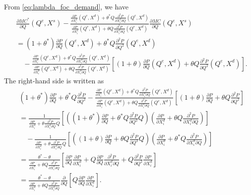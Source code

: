 \documentclass[11pt, a4paper]{article}
\theoremstyle{remark}
\begin{document}
From \eqref{eq:lambda_foc_demand}, we have
\begin{align}
    &\frac{\partial MC^{*}}{\partial Q}(Q^e, X^{s}) - \frac{\frac{\partial P}{\partial X^{d}_i}(Q^e, X^{d}) + \theta^{*} Q\frac{\partial^2 P}{\partial X^{d}_{i}\partial Q}(Q^e, X^{d}) }{\frac{\partial P}{\partial X^{d}_i}(Q^e, X^{d}) + \theta Q\frac{\partial^2 P}{\partial X^{d}_{i}\partial Q}(Q^e, X^{d}) }\frac{\partial MC}{\partial Q}(Q^e, X^{s})\\
    & =  (1+ \theta^{*}) \frac{\partial P}{\partial Q}(Q^e, X^{d}) + \theta^{*} Q\frac{\partial^2 P}{\partial Q^2}(Q^e, X^{d})\\
    &\quad - \frac{\frac{\partial P}{\partial X^{d}_i}(Q^e, X^{d}) + \theta^{*} Q\frac{\partial^2 P}{\partial X^{d}_{i}\partial Q}(Q^e, X^{d}) }{\frac{\partial P}{\partial X^{d}_i}(Q^e, X^{d}) + \theta Q\frac{\partial^2 P}{\partial X^{d}_{i}\partial Q}(Q^e, X^{d}) }\left[(1+ \theta) \frac{\partial P}{\partial Q}(Q^e, X^{d}) + \theta Q\frac{\partial^2 P}{\partial Q^2}(Q^e, X^{d})\right].\label{eq:mc_transformation_1}
\end{align}
The right-hand side is written as
\begin{align}
    & (1+ \theta^{*})\frac{\partial P}{\partial Q} + \theta^{*} Q\frac{\partial^2 P}{\partial Q^2} - \frac{\frac{\partial P}{\partial X^{d}_i}(Q^e, X^{d}) + \theta^{*} Q\frac{\partial^2 P}{\partial X^{d}_{i}\partial Q}(Q^e, X^{d}) }{\frac{\partial P}{\partial X^{d}_i}(Q^e, X^{d}) + \theta Q\frac{\partial^2 P}{\partial X^{d}_{i}\partial Q}(Q^e, X^{d}) }\left[(1+ \theta) \frac{\partial P}{\partial Q} + \theta Q\frac{\partial^2 P}{\partial Q^2}\right]\\
    &= \frac{1}{\frac{\partial P}{\partial X^{d}_i} + \theta\frac{\partial^2 P}{\partial X^{d}_{i}\partial Q}Q}\left[\left((1 + \theta^{*}) \frac{\partial P}{\partial Q} + \theta^{*} Q\frac{\partial^2 P}{\partial  Q^2}Q\right)\left(\frac{\partial P}{\partial X^{d}_i} + \theta Q\frac{\partial^2 P}{\partial X^{d}_{i}\partial Q}\right)\right]\\
    &\quad - \frac{1}{\frac{\partial P}{\partial X^{d}_i} + \theta\frac{\partial^2 P}{\partial X^{d}_{i}\partial Q}Q}\left[\left( (1 + \theta) \frac{\partial P}{\partial Q} + \theta Q\frac{\partial^2 P}{\partial Q^2}Q\right)\left(\frac{\partial P}{\partial X^{d}_i} + \theta^{*} Q\frac{\partial^2 P}{\partial X^{d}_{i}\partial Q}\right)\right]\\
    & = \frac{\theta^{*} - \theta}{\frac{\partial P}{\partial X^{d}_i} + \theta Q\frac{\partial^2 P}{\partial X^{d}_{i}\partial Q}}\left[\frac{\partial P}{\partial Q} \frac{\partial P}{\partial X^{d}_i} + Q \frac{\partial P}{\partial Q} \frac{\partial^2 P}{\partial X^{d}_i\partial Q} + Q\frac{\partial^2 P}{\partial Q^2} \frac{\partial P}{\partial X^{d}_i} \right]\\
    & = \frac{\theta^{*} - \theta}{\frac{\partial P}{\partial X^{d}_i} + \theta Q\frac{\partial^2 P}{\partial X^{d}_{i}\partial Q}}\frac{\partial}{\partial Q}\left[ Q \frac{\partial P}{\partial Q} \frac{\partial P}{\partial X^{d}_i} \right].
\end{align}
\end{document}
